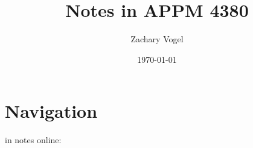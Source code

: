 \documentclass{article}
\author{Zachary Vogel}
\title{Notes in APPM 4380}
\date{\today}
\begin{document}
\maketitle
\section{Navigation}
in notes online:\\
\end{document}
